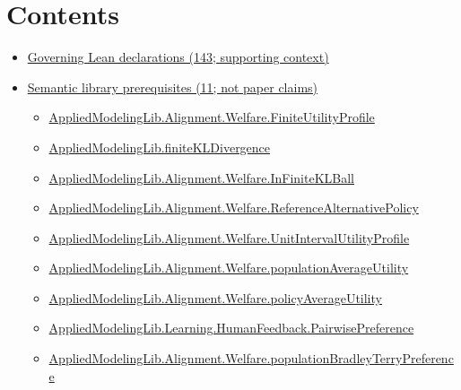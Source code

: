 \documentclass[10pt]{article}
\begin{document}
\section*{Contents}
\begin{itemize}[leftmargin=1.2em]
\item \hyperlink{governing-declaration-section-5ef5ef0364b6939c}{Governing Lean declarations (143; supporting context)}
\item \hyperlink{library-section-e44db2071aa7a1c7}{Semantic library prerequisites (11; not paper claims)}
\begin{itemize}[leftmargin=1.2em]
\item \hyperlink{library-prerequisite-56c0734f8877ddbe}{Applied\allowbreak{}Modeling\allowbreak{}Lib.\allowbreak{}Alignment.\allowbreak{}Welfare.\allowbreak{}Finite\allowbreak{}Utility\allowbreak{}Profile}
\item \hyperlink{library-prerequisite-d3573881ae45d4c6}{Applied\allowbreak{}Modeling\allowbreak{}Lib.\allowbreak{}finite\allowbreak{}KL\allowbreak{}Divergence}
\item \hyperlink{library-prerequisite-1d625de57bf58a6a}{Applied\allowbreak{}Modeling\allowbreak{}Lib.\allowbreak{}Alignment.\allowbreak{}Welfare.\allowbreak{}In\allowbreak{}Finite\allowbreak{}KL\allowbreak{}Ball}
\item \hyperlink{library-prerequisite-e35e7dd3bb4adb9e}{Applied\allowbreak{}Modeling\allowbreak{}Lib.\allowbreak{}Alignment.\allowbreak{}Welfare.\allowbreak{}Reference\allowbreak{}Alternative\allowbreak{}Policy}
\item \hyperlink{library-prerequisite-cbe8afa0d6d1ba78}{Applied\allowbreak{}Modeling\allowbreak{}Lib.\allowbreak{}Alignment.\allowbreak{}Welfare.\allowbreak{}Unit\allowbreak{}Interval\allowbreak{}Utility\allowbreak{}Profile}
\item \hyperlink{library-prerequisite-15f4b442749deab2}{Applied\allowbreak{}Modeling\allowbreak{}Lib.\allowbreak{}Alignment.\allowbreak{}Welfare.\allowbreak{}population\allowbreak{}Average\allowbreak{}Utility}
\item \hyperlink{library-prerequisite-184c74a4db4311c2}{Applied\allowbreak{}Modeling\allowbreak{}Lib.\allowbreak{}Alignment.\allowbreak{}Welfare.\allowbreak{}policy\allowbreak{}Average\allowbreak{}Utility}
\item \hyperlink{library-prerequisite-7e2db20cf087d9ba}{Applied\allowbreak{}Modeling\allowbreak{}Lib.\allowbreak{}Learning.\allowbreak{}Human\allowbreak{}Feedback.\allowbreak{}Pairwise\allowbreak{}Preference}
\item \hyperlink{library-prerequisite-cf06d15d7f8b7c31}{Applied\allowbreak{}Modeling\allowbreak{}Lib.\allowbreak{}Alignment.\allowbreak{}Welfare.\allowbreak{}population\allowbreak{}Bradley\allowbreak{}Terry\allowbreak{}Preference}

\end{itemize}
\end{itemize}
\end{document}
